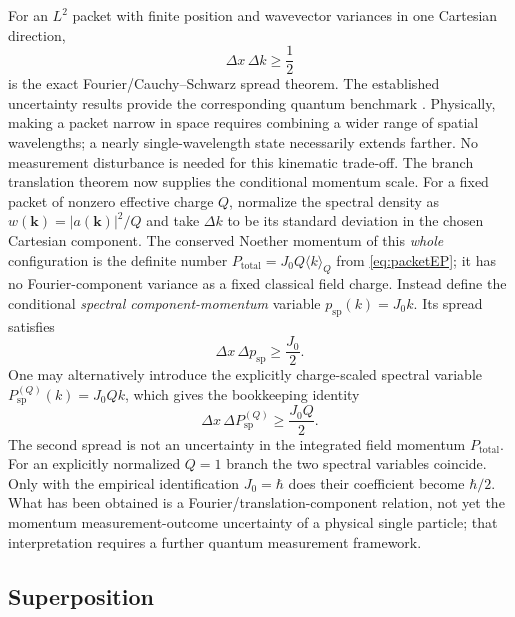 \documentclass[11pt]{article}
\theoremstyle{definition}
\begin{document}
For an $L^2$ packet with finite position and wavevector variances in one
Cartesian direction,
\begin{equation}
 \Delta x\,\Delta k\geq\frac12
 \label{eq:fourier}
\end{equation}
is the exact Fourier/Cauchy--Schwarz spread theorem. The established
uncertainty results provide the corresponding quantum benchmark
\cite{Heisenberg1927,Kennard1927,Robertson1929}.  Physically, making a packet narrow in
space requires combining a wider range of spatial wavelengths; a nearly single-wavelength
state necessarily extends farther.  No measurement disturbance is needed for this kinematic
trade-off.  The branch translation theorem now supplies the conditional momentum
scale.  For a fixed packet of nonzero effective charge $Q$, normalize the
spectral density as
$w(\mathbf k)=|a(\mathbf k)|^2/Q$ and take $\Delta k$ to be its standard deviation in the
chosen Cartesian component.  The conserved Noether momentum of this \emph{whole}
configuration is the definite number $P_{\mathrm{total}}=J_0Q\langle k\rangle_Q$
from \eqref{eq:packetEP}; it has no Fourier-component variance as a fixed classical
field charge.  Instead define the conditional \emph{spectral component-momentum}
variable $p_{\mathrm{sp}}(k)=J_0k$.  Its spread satisfies
\begin{equation}
 \boxed{\Delta x\,\Delta p_{\mathrm{sp}}\geq\frac{J_0}{2}.}
 \label{eq:uncertaintysp}
\end{equation}
One may alternatively introduce the explicitly charge-scaled spectral variable
$P^{(Q)}_{\mathrm{sp}}(k)=J_0Qk$, which gives the bookkeeping identity
\begin{equation}
 \boxed{\Delta x\,\Delta P^{(Q)}_{\mathrm{sp}}\geq\frac{J_0Q}{2}.}
 \label{eq:uncertaintyQ}
\end{equation}
The second spread is not an uncertainty in the integrated field momentum
$P_{\mathrm{total}}$.  For an explicitly normalized $Q=1$ branch the two
spectral variables coincide.  Only with the empirical identification $J_0=\hbar$
does their coefficient become $\hbar/2$.  What has been obtained is a
Fourier/translation-component relation, not yet the momentum measurement-outcome
uncertainty of a physical single particle; that interpretation requires a further
quantum measurement framework.

\subsection{Superposition}
\end{document}
